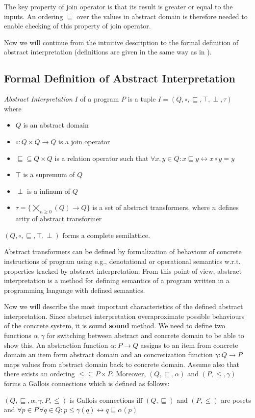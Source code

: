 \documentclass[a4paper, 12pt]{article}
\newcommand{\aord}[0]{\sqsubseteq}
\newcommand{\cord}[0]{\leq}
\newcommand{\adom}[0]{Q}
\newcommand{\aitem}[0]{q}
\newcommand{\asup}[0]{\top}
\newcommand{\ainf}[0]{\perp}
\newcommand{\cdom}[0]{P}
\newcommand{\citem}[0]{p}
\newcommand{\atrans}[0]{\tau}
\newcommand{\ajoin}[0]{\circ}
\newcommand{\afun}[0]{\alpha}
\newcommand{\cfun}[0]{\gamma}
\begin{document}
The key property of join operator is that its result is greater or
equal to the inputs.
An ordering $\aord$ over the values in abstract domain is therefore needed
to enable checking of this property of join operator.

Now we will continue from the intuitive description to
the formal definition of abstract interpretation (definitions
are given in the same way as in \cite{popl77}).

\subsection{Formal Definition of Abstract Interpretation}
\emph{Abstract Interpretation} $I$ of a program $P$ is a tuple
$I=(\adom, \ajoin, \aord, \asup, \ainf, \atrans)$ where
\begin{itemize}
	\item $\adom$ is an abstract domain
	\item $\ajoin: \adom \times \adom \rightarrow \adom$ is a join operator
	\item $\aord \subseteq \adom \times \adom$ is a relation operator such that $\forall x,y \in \adom: x \aord y \leftrightarrow x \ajoin y = y$
	\item $\asup$ is a supremum of $\adom$
	\item $\ainf$ is a infinum of $\adom$
	\item $\atrans = \{\bigtimes_{n\geq 0}(\adom) \rightarrow \adom\}$ is a set of abstract transformers, where $n$ defines arity of abstract transformer
\end{itemize}


$(\adom, \ajoin, \aord, \top, \perp)$ forms a complete semilattice.

Abstract transformers can be defined by formalization of behaviour of concrete instructions
of program using e.g., denotational or operational semantics w.r.t. properties tracked
by abstract interpretation.
From this point of view, abstract interpretation is a method for defining semantics
of a program written in a programming language with defined semantics.

Now we will describe the most important characteristics of the defined abstract interpretation.
Since abstract interpretation overaproximate possible behaviours of
the concrete system, it is sound \textbf{sound} method.
We need to define two functions $\afun, \cfun$ for switching between abstract
and concrete domain to be able to show this.
An abstraction function $\afun: \cdom \rightarrow \adom$ assigns to an item from
concrete domain an item form abstract domain and an concretization function
$\cfun: \adom \rightarrow \cdom$ maps values from abstract domain back to concrete domain.
Assume also that there exists an ordering $\cord \subseteq \cdom \times \cdom$.
Moreover, $(\adom, \aord, \afun)$ and $(\cdom, \cord, \cfun)$ forms
a Gallois connections which is defined as follows:
\begin{center}
	$(\adom, \aord, \afun, \cfun, \cdom, \cord)$ is Gallois connections iff
	$(\adom, \aord)$ and $(\cdom, \cord)$ are posets and
	$\forall \citem \in \cdom \, \forall \aitem \in \adom: \citem \cord \cfun(\aitem)
	\leftrightarrow \aitem \aord \afun(\citem)$
\end{center}
\end{document}

